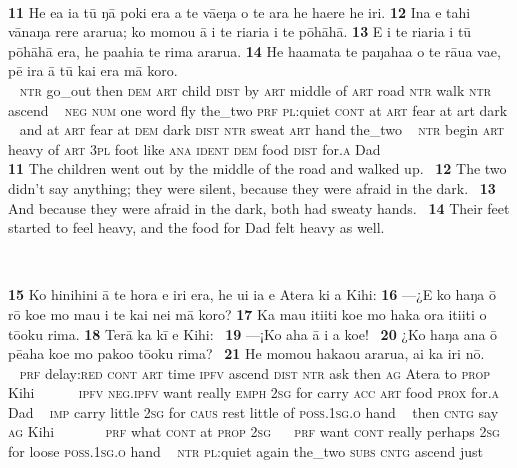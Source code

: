 {~

\bigskip\gll
\textbf{\textup{11}} He e{\ꞌ}a ia tū ŋā poki era a te vāeŋa o te ara he ha{\ꞌ}ere he iri. \textbf{\textup{12}} {\ꞌ}Ina e tahi vānaŋa rere ararua; ko momou {\ꞌ}ā {\ꞌ}i te ri{\ꞌ}ari{\ꞌ}a {\ꞌ}i te pōhāhā. \textbf{\textup{13}} {\ꞌ}E {\ꞌ}i te ri{\ꞌ}ari{\ꞌ}a {\ꞌ}i tū pōhāhā era, he pa{\ꞌ}ahia te rima ararua. \textbf{\textup{14}} He ha{\ꞌ}amata te paŋaha{\ꞌ}a o te rāua va{\ꞌ}e, pē ira {\ꞌ}ā tū kai era mā koro.\\
~ \textsc{ntr} go\_out then \textsc{dem} \textsc{art} child \textsc{dist} by \textsc{art} middle of \textsc{art} road \textsc{ntr} walk \textsc{ntr} ascend ~ \textsc{neg} \textsc{num} one word fly the\_two \textsc{prf} \textsc{pl}:quiet \textsc{cont} at \textsc{art} fear at art dark  ~ and at \textsc{art} fear at \textsc{dem} dark \textsc{dist} \textsc{ntr} sweat \textsc{art} hand the\_two  ~ \textsc{ntr} begin \textsc{art} heavy of \textsc{art} \textsc{3pl} foot like \textsc{ana} \textsc{ident} \textsc{dem} food \textsc{dist} for\textsc{.a} Dad\\

\medskip\glt
\textbf{\textup{11}} The children went out by the middle of the road and walked up. ~\textbf{\textup{12}} The two didn’t say anything; they were silent, because they were afraid in the dark. ~\textbf{\textup{13}} And because they were afraid in the dark, both had sweaty hands. ~\textbf{\textup{14}} Their feet started to feel heavy, and the food for Dad felt heavy as well.


~

\bigskip\gll
\textbf{\textup{15}} Ko hinihini {\ꞌ}ā te hora e iri era, he {\ꞌ}ui ia e {\ꞌ}Atera ki a Kihi: \textbf{\textup{16}} —¿E ko haŋa {\ꞌ}ō rō koe mo ma{\ꞌ}u i te kai nei mā koro? \textbf{\textup{17}} Ka ma{\ꞌ}u {\ꞌ}iti{\ꞌ}iti koe mo haka ora {\ꞌ}iti{\ꞌ}iti o tō{\ꞌ}oku rima. \textbf{\textup{18}} Terā ka kī e Kihi: ~\textbf{\textup{19}} ––¡Ko aha {\ꞌ}ā i a koe! ~\textbf{\textup{20}} ¿Ko haŋa {\ꞌ}ana {\ꞌ}ō pēaha koe mo pako{\ꞌ}o tō{\ꞌ}oku rima? ~\textbf{\textup{21}} He momou haka{\ꞌ}ou ararua, {\ꞌ}ai ka iri nō.\\
~ \textsc{prf} delay:\textsc{red} \textsc{cont} \textsc{art} time \textsc{ipfv} ascend \textsc{dist} \textsc{ntr} ask then \textsc{ag} Atera to \textsc{prop} Kihi ~ ~~~~\textsc{ipfv} \textsc{neg.ipfv} want really \textsc{emph} \textsc{2sg} for carry \textsc{acc} \textsc{art} food \textsc{prox} for\textsc{.a} Dad  ~ \textsc{imp} carry little \textsc{2sg} for \textsc{caus} rest little of \textsc{poss.1sg.o} hand ~ then \textsc{cntg} say \textsc{ag} Kihi ~ ~~~~~\textsc{prf} what \textsc{cont} at \textsc{prop} \textsc{2sg} ~ ~\textsc{prf} want \textsc{cont} really perhaps \textsc{2sg} for loose \textsc{poss.1sg.o} hand ~ \textsc{ntr} \textsc{pl}:quiet again the\_two \textsc{subs} \textsc{cntg} ascend just\\

}
